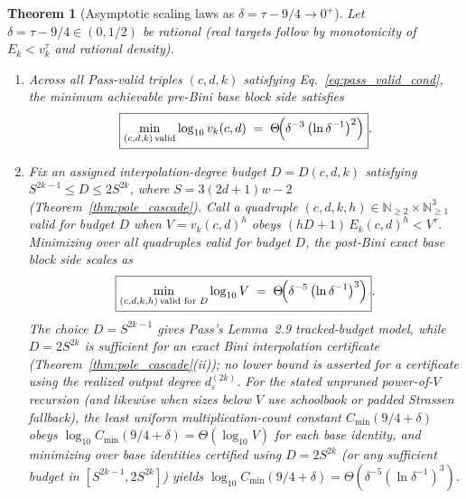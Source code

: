 \documentclass[11pt,a4paper]{article}
\theoremstyle{plain}
\newtheorem{theorem}{Theorem}[section]
\theoremstyle{definition}
\theoremstyle{remark}
\newcommand{\N}{\mathbb{N}}
\begin{document}
\begin{theorem}[Asymptotic scaling laws as $\delta = \tau - 9/4 \to 0^+$]
\label{thm:asymptotic_scaling}
Let $\delta = \tau - 9/4 \in (0, 1/2)$ be rational (real targets follow by monotonicity of $E_k < v_k^\tau$ and rational density).
\begin{enumerate}[label=(\roman*)]
\item Across all Pass-valid triples $(c, d, k)$ satisfying Eq.~\eqref{eq:pass_valid_cond}, the minimum achievable pre-Bini base block side satisfies
\begin{equation}
    \boxed{\min_{(c, d, k)\,\text{valid}} \log_{10} v_k(c, d) \;=\; \Theta\!\Bigl(\delta^{-3}\,\bigl(\ln \delta^{-1}\bigr)^2\Bigr)} .
    \label{eq:asymptotic_pre}
\end{equation}
\item Fix an assigned interpolation-degree budget $D = D(c, d, k)$ satisfying $S^{2k-1} \le D \le 2 S^{2k}$, where $S = 3(2d + 1)w - 2$ (Theorem~\ref{thm:pole_cascade}). Call a quadruple $(c, d, k, h) \in \N_{\ge 2} \times \N_{\ge 1}^3$ \emph{valid for budget $D$} when $V = v_k(c, d)^h$ obeys $(h D + 1)\,E_k(c, d)^h < V^\tau$. Minimizing over all quadruples valid for budget $D$, the post-Bini exact base block side scales as
\begin{equation}
    \boxed{\min_{(c, d, k, h)\,\text{valid for }D} \log_{10} V \;=\; \Theta\!\Bigl(\delta^{-5}\,\bigl(\ln \delta^{-1}\bigr)^3\Bigr)} .
    \label{eq:asymptotic_post}
\end{equation}
The choice $D = S^{2k-1}$ gives Pass's Lemma~2.9 tracked-budget model, while $D = 2 S^{2k}$ is sufficient for an exact Bini interpolation certificate (Theorem~\ref{thm:pole_cascade}(ii)); no lower bound is asserted for a certificate using the realized output degree $d_\varepsilon^{(2k)}$. For the stated unpruned power-of-$V$ recursion (and likewise when sizes below $V$ use schoolbook or padded Strassen fallback), the least uniform multiplication-count constant $C_{\min}(9/4 + \delta)$ obeys $\log_{10} C_{\min}(9/4 + \delta) = \Theta(\log_{10} V)$ for each base identity, and minimizing over base identities certified using $D = 2 S^{2k}$ (or any sufficient budget in $[S^{2k-1}, 2 S^{2k}]$) yields $\log_{10} C_{\min}(9/4 + \delta) = \Theta(\delta^{-5}(\ln \delta^{-1})^3)$.
\end{enumerate}
\end{theorem}
\end{document}
